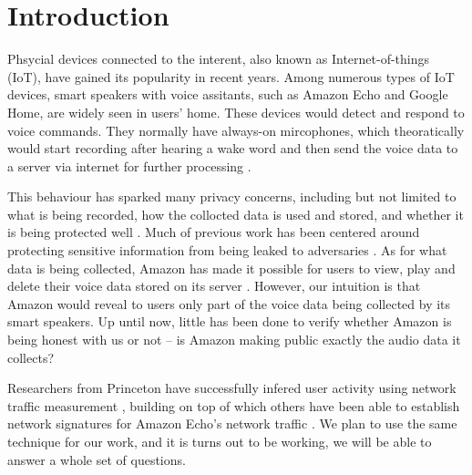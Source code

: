 \section{Introduction}
Phsycial devices connected to the interent, also known as Internet-of-things (IoT), have gained its popularity in recent years. Among numerous types of IoT devices, smart speakers with voice assitants, such as Amazon Echo and Google Home, are widely seen in users' home. These devices would detect and respond to voice commands. They normally have always-on mircophones, which theoratically would start recording after hearing a wake word and then send the voice data to a server via internet for further processing \cite{AmazonEc68:online}.

This behaviour has sparked many privacy concerns, including but not limited to what is being recorded, how the collocted data is used and stored, and whether it is being protected well \cite{lau2018alexa, fowler_2019, apthorpe2017smart, apthorpe2019keeping, apthorpe2017spying}. Much of previous work has been centered around protecting sensitive information from being leaked to adversaries \cite{apthorpe2017smart, apthorpe2019keeping, apthorpe2017spying}. As for what data is being collected, Amazon has made it possible for users to view, play and delete their voice data stored on its server \cite{ford2019alexa}. However, our intuition is that Amazon would reveal to users only part of the voice data being collected by its smart speakers. Up until now, little has been done to verify whether Amazon is being honest with us or not -- is Amazon making public exactly the audio data it collects?

Researchers from Princeton have successfully infered user activity using network traffic measurement \cite{apthorpe2017spying}, building on top of which others have been able to establish network signatures for Amazon Echo's network traffic \cite{ford2019alexa}. We plan to use the same technique for our work, and it is turns out to be working, we will be able to answer a whole set of questions.
